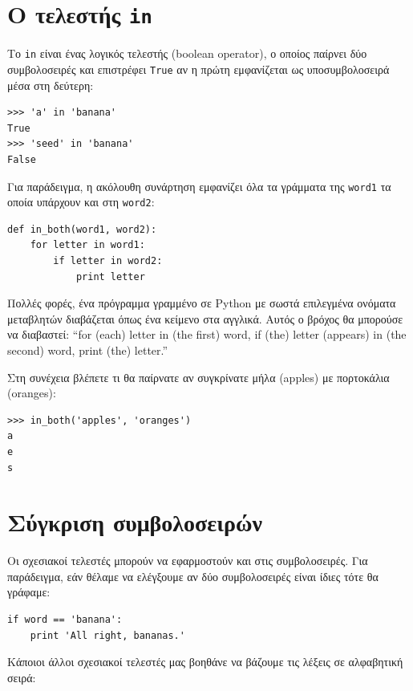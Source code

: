 \documentclass[10pt]{book}
\begin{document}
\section{Ο τελεστής {\tt in}}
\label{inboth}

Το {\tt in} είναι ένας λογικός τελεστής (boolean operator), ο οποίος παίρνει
δύο συμβολοσειρές και επιστρέφει {\tt True} αν η πρώτη εμφανίζεται ως υποσυμβολοσειρά μέσα στη δεύτερη:

\begin{verbatim}
>>> 'a' in 'banana'
True
>>> 'seed' in 'banana'
False
\end{verbatim}
%

Για παράδειγμα, η ακόλουθη συνάρτηση εμφανίζει όλα τα γράμματα της
{\tt word1} τα οποία υπάρχουν και στη {\tt word2}:

\begin{verbatim}
def in_both(word1, word2):
    for letter in word1:
        if letter in word2:
            print letter
\end{verbatim}
%

Πολλές φορές, ένα πρόγραμμα γραμμένο σε Python με σωστά επιλεγμένα ονόματα μεταβλητών διαβάζεται όπως ένα κείμενο στα αγγλικά. Αυτός ο βρόχος θα μπορούσε να διαβαστεί: ``for (each) letter in (the first) word, if (the) letter (appears) in (the second) word, print (the) letter.''

Στη συνέχεια βλέπετε τι θα παίρνατε αν συγκρίνατε μήλα (apples) με πορτοκάλια (oranges):

\begin{verbatim}
>>> in_both('apples', 'oranges')
a
e
s
\end{verbatim}
%

\section{Σύγκριση συμβολοσειρών}

Οι σχεσιακοί τελεστές μπορούν να εφαρμοστούν και στις συμβολοσειρές. Για παράδειγμα, εάν θέλαμε να ελέγξουμε αν δύο συμβολοσειρές είναι ίδιες τότε θα γράφαμε:

\begin{verbatim}
if word == 'banana':
    print 'All right, bananas.'
\end{verbatim}
%

Κάποιοι άλλοι σχεσιακοί τελεστές μας βοηθάνε να βάζουμε τις λέξεις σε αλφαβητική σειρά:
\end{document}
